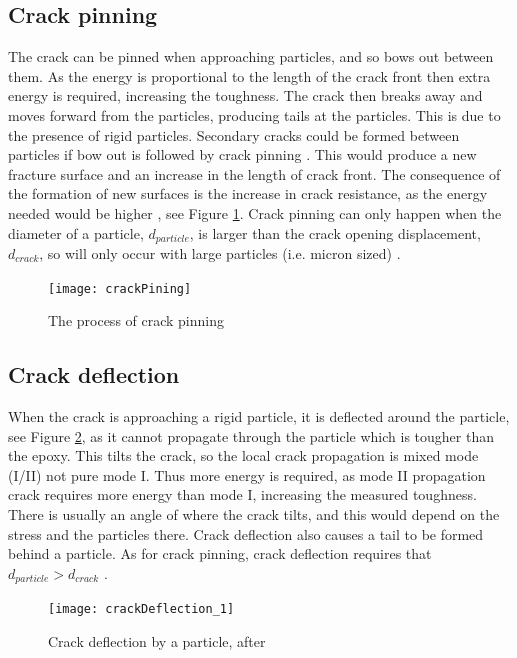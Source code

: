 \documentclass[numbers=noendperiod,chapterprefix=on]{icldt} %
\begin{document}
\subsection{Crack pinning} \label{Crack_pinning}
The crack can be pinned when approaching particles, and so bows out between them. As the energy is proportional to the length of the crack front then extra energy is required, increasing the toughness. The crack then breaks away and moves forward from the particles, producing tails at the particles. This is due to the presence of rigid particles. Secondary cracks could be formed between particles if bow out is followed by crack pinning \cite{ISO13586}. This would produce a new fracture surface and an increase in the length of crack front. The consequence of the formation of new surfaces is the increase in crack resistance, as the energy needed would be higher \cite{ISO13586}, see Figure \ref{crackPining}. 
Crack pinning can only happen when the diameter of a particle, $d_{particle}$, is larger than the crack opening displacement, $d_{crack}$, so will only occur with large particles (i.e. micron sized) \cite{Kinloch1994}. 

\begin{figure}[!htpb]
\centering
\texttt{[image: crackPining]}
\caption{The process of crack pinning \cite{Mohammed2007}} \label{crackPining}
\end{figure}

\subsection{Crack deflection}
When the crack is approaching a rigid particle, it is deflected around the particle, see Figure \ref{crackDeflection}, as it cannot propagate through the particle which is tougher than the epoxy. This tilts the crack, so the local crack propagation is mixed mode (I/II) not pure mode I. Thus more energy is required, as mode II propagation crack requires more energy than mode I, increasing the measured toughness. There is usually an angle of where the crack tilts, and this would depend on the stress and the particles there. Crack deflection also causes a tail to be formed behind a particle. As for crack pinning, crack deflection requires that $d_{particle} > d_{crack}$ \cite{Kinloch1994}. 

\begin{figure}[!htpb]
\centering
\texttt{[image: crackDeflection\_1]} 
\caption{Crack deflection by a particle, after \cite{Kinloch1994}} \label{crackDeflection}
\end{figure}
\FloatBarrier
\end{document}
